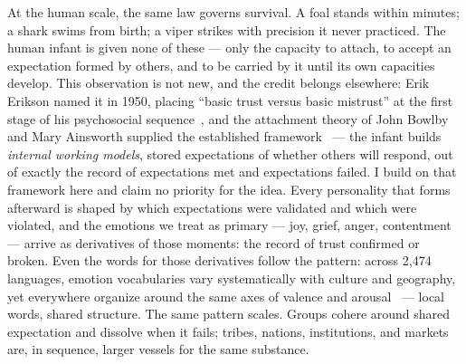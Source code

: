 \documentclass[11pt]{article}
\begin{document}
At the human scale, the same law governs survival. A foal stands within minutes; a shark swims from birth; a viper strikes with precision it never practiced. The human infant is given none of these --- only the capacity to attach, to accept an expectation formed by others, and to be carried by it until its own capacities develop. This observation is not new, and the credit belongs elsewhere: Erik Erikson named it in 1950, placing ``basic trust versus basic mistrust'' at the first stage of his psychosocial sequence~\cite{erikson1950}, and the attachment theory of John Bowlby and Mary Ainsworth supplied the established framework~\cite{bowlby1969,ainsworth1978} --- the infant builds \emph{internal working models}, stored expectations of whether others will respond, out of exactly the record of expectations met and expectations failed. I build on that framework here and claim no priority for the idea. Every personality that forms afterward is shaped by which expectations were validated and which were violated, and the emotions we treat as primary --- joy, grief, anger, contentment --- arrive as derivatives of those moments: the record of trust confirmed or broken. Even the words for those derivatives follow the pattern: across 2,474 languages, emotion vocabularies vary systematically with culture and geography, yet everywhere organize around the same axes of valence and arousal~\cite{jackson2019} --- local words, shared structure. The same pattern scales. Groups cohere around shared expectation and dissolve when it fails; tribes, nations, institutions, and markets are, in sequence, larger vessels for the same substance.
\end{document}
